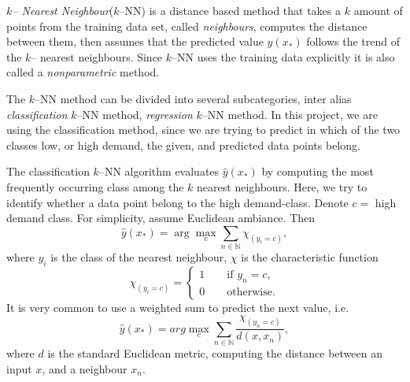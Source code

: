     \emph{$k$-- Nearest Neighbour}($k$--NN) is a distance based method that takes a $k$ amount of points from the training data set, called \emph{neighbours}, computes the distance between them, then assumes that the predicted value $\hat{y}(x_{*})$ follows the trend of the $k$-- nearest neighbours. Since $k$--NN uses the training data explicitly it is also called a \emph{nonparametric} method.

    The $k$--NN method can be divided into several subcategories, inter alias \emph{classification} $k$--NN method, \emph{regression}  $k$--NN method. In this project, we are using the classification method, since we are trying to predict in which of the two classes low, or high demand, the given, and predicted data points belong.

    The classification  $k$--NN algorithm evaluates $\hat{y}(x_{*})$ by computing the most frequently occurring class among the $k$ nearest neighbours. Here, we try to identify whether a data point belong to the high demand-class. Denote $c=$ high demand class. For simplicity, assume Euclidean ambiance. Then
        \begin{equation*}
            \hat{y}(x_*) = \arg \max_{c}  \sum_{n \in \mathbb{N}} \chi_{(y_i = c)} ,
        \end{equation*}
    where $y_i$ is the class of the nearest neighbour,  $\chi$ is the characteristic function 
        \begin{equation*}
            \chi_{(y_i = c)} = 
            \begin{cases}
                1 \qquad \text{if } y_n = c, \\
                0 \qquad \text{otherwise}.
                
            \end{cases}
        \end{equation*}
    It is very common to use a weighted sum to predict the next value, i.e.
        \begin{equation*}
            \hat{y}(x_*) =  arg \max_{c}  \sum_{n \in \mathbb{N}} \frac{\chi_{(y_n = c)}}{d(x, x_n)},
        \end{equation*}
    where $d$ is the standard Euclidean metric, computing the distance between an input $x$, and a neighbour $x_n$. 

